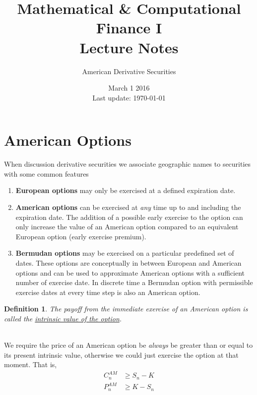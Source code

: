 \documentclass[12pt]{article}
\newtheorem{definition}{Definition}
\newlength\tindent
\renewcommand{\indent}{\hspace*{\tindent}}
\begin{document}
 
 
\title{Mathematical \& Computational Finance I\\Lecture Notes}
\author{American Derivative Securities}
\date{March 1 2016 \\ Last update: \today{}}
\maketitle

\section{American Options}

When discussion derivative securities we associate geographic names to securities with some common features
\begin{enumerate}[]
	\item {\bf European options} may only be exercised at a defined expiration date.
	\item {\bf American options} can be exercised at {\em any} time up to and including the expiration date. The addition of a possible early exercise to the option can only increase the value of an American option compared to an equivalent European option (early exercise premium).
	\item {\bf Bermudan options} may be exercised on a particular predefined set of dates. These options are conceptually in between European and American options and can be used to approximate American options with a sufficient number of exercise date. In discrete time a Bermudan option with permissible exercise dates at every time step is also an American option.
\end{enumerate}

\begin{definition} The payoff from the immediate exercise of an American option is called the \underline{intrinsic value of the option}.
\end{definition} \hfill\\

\indent We require the price of an American option be {\em always} be greater than or equal to its present intrinsic value, otherwise  we could just exercise the option at that moment. That is,
\begin{align*}
	C^{AM}_n &\geq S_n - K \\
	P^{AM}_n &\geq K - S_n
\end{align*}
\end{document}

